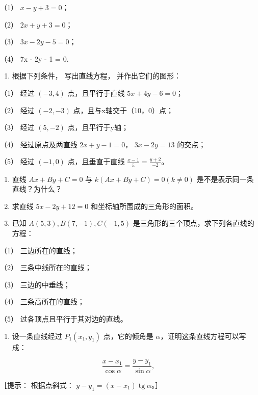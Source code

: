 （1） \(x - y + 3 = 0\)；

（2） \(2x + y + 3 = 0\)；

（3） \(3x - 2y - 5 = 0\)；

（4） 7x - 2y - 1 = 0.

\begin{enumerate}
\def\labelenumi{\arabic{enumi}.}
\tightlist
\item
  根据下列条件， 写出直线方程， 并作出它们的图形：
\end{enumerate}

（1） 经过 \((-3,4)\) 点，且平行于直线 \(5x+4y-6=0\)；

（2） 经过 \((-2,-3)\) 点，且与x轴交于（10，0）点；

（3） 经过 \((5,-2)\) 点，且平行于y轴；

（4） 经过原点及两直线 \(2x + y - 1 = 0\)， \(3x - 2y = 13\) 的交点；

（5） 经过 \((-1,0)\) 点，且垂直于直线
\(\frac{x-1}{5}=\frac{y+2}{-2}\)。

\begin{enumerate}
\def\labelenumi{\arabic{enumi}.}
\setcounter{enumi}{1}
\item
  直线 \(Ax + By + C = 0\) 与 \(k(Ax + By + C) = 0 (k \neq 0)\)
  是不是表示同一条直线？为什么？
\item
  求直线 \(5x - 2y + 12 = 0\) 和坐标轴所围成的三角形的面积。
\item
  已知 \(A(5, 3), B(7, -1), C(-1, 5)\)
  是三角形的三个顶点，求下列各直线的方程：
\end{enumerate}

（1） 三边所在的直线；

（2） 三条中线所在的直线；

（3） 三边的中垂线；

（4） 三条高所在的直线；

（5） 过各顶点且平行于其对边的直线。

\begin{enumerate}
\def\labelenumi{\arabic{enumi}.}
\setcounter{enumi}{4}
\tightlist
\item
  设一条直线经过 \(P_{1}(x_{1}, y_{1})\) 点，它的倾角是
  \(\alpha\)，证明这条直线方程可以写成：
\end{enumerate}

\[
\frac {x - x_{1}}{\cos \alpha} = \frac {y - y_{1}}{\sin \alpha},
\]

［提示： 根据点斜式：
\(y - y_{1} = (x - x_{1}) \operatorname{tg} \alpha\)。］

